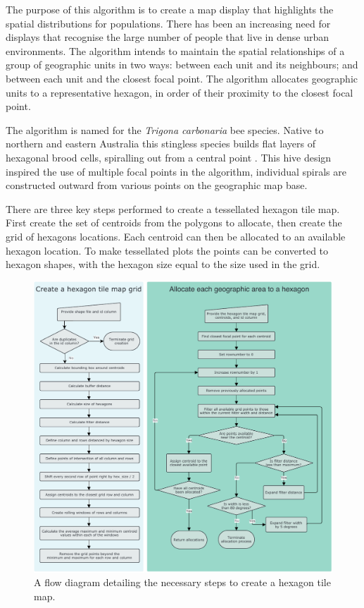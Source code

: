 The purpose of this algorithm is to create a map display that highlights
the spatial distributions for populations. There has been an increasing
need for displays that recognise the large number of people that live in
dense urban environments. The algorithm intends to maintain the spatial
relationships of a group of geographic units in two ways: between each
unit and its neighbours; and between each unit and the closest focal
point. The algorithm allocates geographic units to a representative
hexagon, in order of their proximity to the closest focal point.

The algorithm is named for the \emph{Trigona carbonaria} bee species.
Native to northern and eastern Australia this stingless species builds
flat layers of hexagonal brood cells, spiralling out from a central
point \citep{PH}. This hive design inspired the use of multiple focal
points in the algorithm, individual spirals are constructed outward from
various points on the geographic map base.

There are three key steps performed to create a tessellated hexagon tile
map. First create the set of centroids from the polygons to allocate,
then create the grid of hexagons locations. Each centroid can then be
allocated to an available hexagon location. To make tessellated plots
the points can be converted to hexagon shapes, with the hexagon size
equal to the size used in the grid.

\begin{figure}
\includegraphics[width=14cm]{figures/flowchart.pdf}
\caption{\label{fig:sugarbag_flow}A flow diagram detailing the necessary steps to create a hexagon tile map.}
\end{figure}

